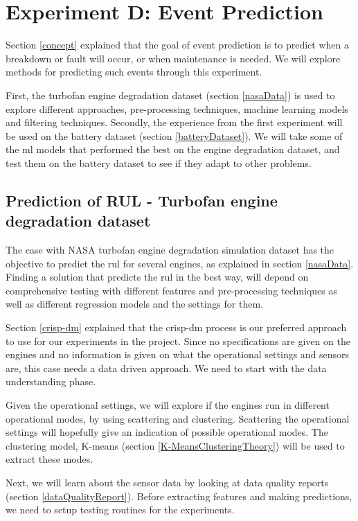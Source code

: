 \documentclass[english, a4paper]{report}
\begin{document}
{    \section{Experiment D: Event Prediction}\label{EventPredictionChap3}
    {
        Section \ref{concept} explained that the goal of event prediction is to predict when a breakdown or fault will occur, or when maintenance is needed. We will explore methods for predicting such events through this experiment. 
        \par 
        First, the turbofan engine degradation dataset (section \ref{nasaData}) is used to explore different approaches, pre-processing techniques, machine learning models and filtering techniques. Secondly, the experience from the first experiment will be used on the battery dataset (section \ref{batteryDataset}). We will take some of the \gls{ml} models that performed the best on the engine degradation dataset, and test them on the battery dataset to see if they adapt to other problems.
        
        \subsection{Prediction of RUL - Turbofan engine degradation dataset}\label{EngineRULProcedure}
        {
            The case with NASA turbofan engine degradation simulation dataset has the objective to predict the \gls{rul} for several engines, as explained in section \ref{nasaData}. Finding a solution that predicts the \gls{rul} in the best way, will depend on comprehensive testing with different features and pre-processing techniques as well as different regression models and the settings for them. 
            \par
            Section \ref{crisp-dm} explained that the \gls{crisp-dm} process is our preferred approach to use for our experiments in the project. Since no specifications are given on the engines and no information is given on what the operational settings and sensors are, this case needs a data driven approach. We need to start with the data understanding phase. 
            \par
            Given the operational settings, we will explore if the engines run in different operational modes, by using scattering and clustering. Scattering the operational settings will hopefully give an indication of possible operational modes. The clustering model, K-means (section \ref{K-MeansClusteringTheory}) will be used to extract these modes.
            \par
            Next, we will learn about the sensor data by looking at data quality reports (section \ref{dataQualityReport}). Before extracting features and making predictions, we need to setup testing routines for the experiments. 
            
}}}
\end{document}
